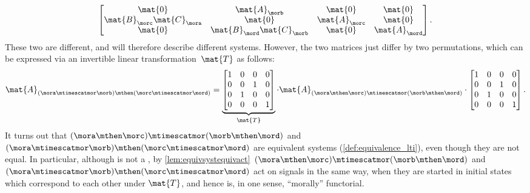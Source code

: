 \begin{example}
\begin{equation}
\begin{bmatrix}
            \mat{0}                     & \mat{A}_\morb               & \mat{0}       & \mat{0}       \\
            \mat{B}_\morc \mat{C}_\mora & \mat{0}                     & \mat{A}_\morc & \mat{0}       \\
            \mat{0}                     & \mat{B}_\mord \mat{C}_\morb & \mat{0}       & \mat{A}_\mord
        \end{bmatrix}.
    \end{equation}
    These two are different, and will therefore describe different systems.
    However, the two matrices just differ by two permutations, which can be expressed via an invertible linear transformation~$\mat{T}$ as follows:
    \begin{equation}\label{eq:checking-LTI-functorial-stacking-3}
        \mat{A}_{(\mora\mtimescatmor \morb)\mthen (\morc\mtimescatmor \mord)}=
        \underbrace{\begin{bmatrix}
                1 & 0 & 0 & 0 \\
                0 & 0 & 1 & 0 \\
                0 & 1 & 0 & 0 \\
                0 & 0 & 0 & 1
            \end{bmatrix}}_{\mat{T}}\cdot
        \mat{A}_{(\mora \mthen \morc)\mtimescatmor (\morb\mthen \mord)}
        \cdot
        \begin{bmatrix}
            1 & 0 & 0 & 0 \\
            0 & 0 & 1 & 0 \\
            0 & 1 & 0 & 0 \\
            0 & 0 & 0 & 1
        \end{bmatrix}.
    \end{equation}
    It turns out that $(\mora \mthen \morc)\mtimescatmor (\morb\mthen \mord)$ and~$(\mora\mtimescatmor \morb)\mthen (\morc\mtimescatmor \mord)$ are equivalent systems (\cref{def:equivalence_lti}), even though they are not equal.
    In particular, although \LTI is not a , by \cref{lem:equivsystequivact}~$(\mora \mthen \morc)\mtimescatmor (\morb\mthen \mord)$ and~$(\mora\mtimescatmor \morb)\mthen (\morc\mtimescatmor \mord)$ act on signals in the same way, when they are started in initial states which correspond to each other under $\mat{T}$, and hence \LTI is, in one sense, ``morally'' functorial.
\end{example}

